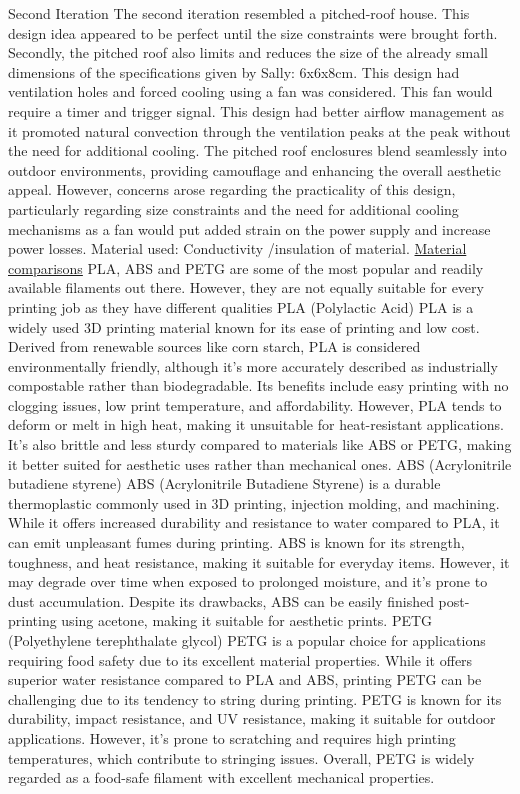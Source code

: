 \documentclass[class=report,11pt,crop=false]{standalone}
\begin{document}
Second Iteration 
The second iteration resembled a pitched-roof house. This design idea appeared to be perfect until the size constraints were brought forth. Secondly, the pitched roof also limits and reduces the size of the already small dimensions of the specifications given by Sally: 6x6x8cm. 
This design had ventilation holes and forced cooling using a fan was considered. This fan would require a timer and trigger signal. This design had better airflow management as it promoted natural convection through the ventilation peaks at the peak without the need for additional cooling. The pitched roof enclosures blend seamlessly into outdoor environments, providing camouflage and enhancing the overall aesthetic appeal. However, concerns arose regarding the practicality of this design, particularly regarding size constraints and the need for additional cooling mechanisms as a fan would put added strain on the power supply and increase power losses.
Material used: Conductivity /insulation of material.
\href{https://all3dp.com/2/pla-vs-abs-vs-petg-differences-compared/#google_vignette}{Material comparisons}  
PLA, ABS and PETG are some of the most popular and readily available filaments out there. However, they are not equally suitable for every printing job as they have different qualities 
PLA (Polylactic Acid)
PLA is a widely used 3D printing material known for its ease of printing and low cost. Derived from renewable sources like corn starch, PLA is considered environmentally friendly, although it's more accurately described as industrially compostable rather than biodegradable. Its benefits include easy printing with no clogging issues, low print temperature, and affordability. However, PLA tends to deform or melt in high heat, making it unsuitable for heat-resistant applications. It's also brittle and less sturdy compared to materials like ABS or PETG, making it better suited for aesthetic uses rather than mechanical ones.
ABS (Acrylonitrile butadiene styrene)
ABS (Acrylonitrile Butadiene Styrene) is a durable thermoplastic commonly used in 3D printing, injection molding, and machining. While it offers increased durability and resistance to water compared to PLA, it can emit unpleasant fumes during printing. ABS is known for its strength, toughness, and heat resistance, making it suitable for everyday items. However, it may degrade over time when exposed to prolonged moisture, and it's prone to dust accumulation. Despite its drawbacks, ABS can be easily finished post-printing using acetone, making it suitable for aesthetic prints.
PETG (Polyethylene terephthalate glycol)
PETG is a popular choice for applications requiring food safety due to its excellent material properties. While it offers superior water resistance compared to PLA and ABS, printing PETG can be challenging due to its tendency to string during printing. PETG is known for its durability, impact resistance, and UV resistance, making it suitable for outdoor applications. However, it's prone to scratching and requires high printing temperatures, which contribute to stringing issues. Overall, PETG is widely regarded as a food-safe filament with excellent mechanical properties.
\end{document}
